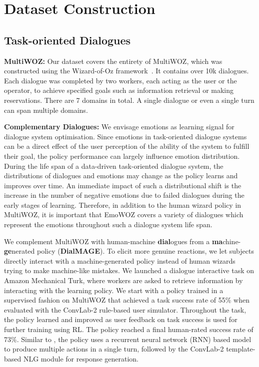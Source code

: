 \documentclass[10pt, a4paper]{article}
\begin{document}
\section{Dataset Construction}
\subsection{Task-oriented Dialogues}
\textbf{MultiWOZ:} Our dataset covers the entirety of MultiWOZ, which was constructed using the Wizard-of-Oz framework~\cite{10.1145/357417.357420}. It contains over 10k dialogues. Each dialogue was completed by two workers, each acting as the user or the operator, to achieve specified goals such as information retrieval or making reservations. There are 7 domains in total. A single dialogue or even a single turn can span multiple domains.\par 


\textbf{Complementary Dialogues:}
We envisage emotions as learning signal for dialogue system optimisation. Since emotions in task-oriented dialogue systems can be a direct effect of the user perception of the ability of the system to fulfill their goal, the policy performance can largely influence emotion distribution. During the life span of a data-driven task-oriented dialogue system, the distributions of dialogues and emotions may change as the policy learns and improves over time. An immediate impact of such a distributional shift is the increase in the number of negative emotions due to failed dialogues during the early stages of learning. Therefore, in addition to the human wizard policy in MultiWOZ, it is important that EmoWOZ covers a variety of dialogues which represent the emotions throughout such a dialogue system life span.

We complement MultiWOZ with human-machine \textbf{dial}ogues from a \textbf{ma}chine-\textbf{ge}nerated policy (\textbf{DialMAGE}). To elicit more genuine reactions, we let subjects directly interact with a machine-generated policy instead of human wizards trying to make machine-like mistakes. We launched a dialogue interactive task on Amazon Mechanical Turk, where workers are asked to retrieve information by interacting with the learning policy. We start with a policy trained in a supervised fashion on MultiWOZ 
that achieved a task success rate of 55\% when evaluated with the ConvLab-2 \cite{convlab2} rule-based user simulator. Throughout the task, the policy learned and improved as user feedback on task success is used for further training using RL. The policy reached a final human-rated success rate of 73\%. Similar to , the policy uses a recurrent neural network (RNN) based model to produce multiple actions in a single turn, followed by the ConvLab-2 template-based NLG module for response generation. \par
\end{document}
